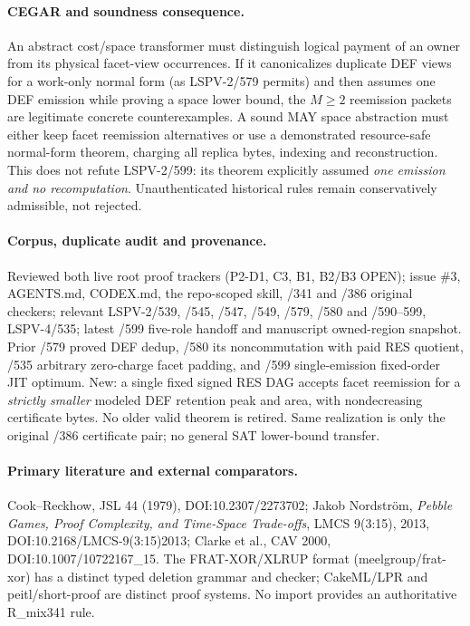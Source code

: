 \documentclass[11pt]{article}
\begin{document}
\paragraph{CEGAR and soundness consequence.}
An abstract cost/space transformer must distinguish logical payment of an owner from its physical facet-view occurrences. If it canonicalizes duplicate DEF views for a work-only normal form (as LSPV-2/579 permits) and then assumes one DEF emission while proving a space lower bound, the $M\ge2$ reemission packets are legitimate concrete counterexamples. A sound MAY space abstraction must either keep facet reemission alternatives or use a demonstrated resource-safe normal-form theorem, charging all replica bytes, indexing and reconstruction. This does not refute LSPV-2/599: its theorem explicitly assumed \emph{one emission and no recomputation}. Unauthenticated historical rules remain conservatively admissible, not rejected.

\paragraph{Corpus, duplicate audit and provenance.}
Reviewed both live root proof trackers (P2-D1, C3, B1, B2/B3 OPEN); issue \#3, AGENTS.md, CODEX.md, the repo-scoped skill, /341 and /386 original checkers; relevant LSPV-2/539, /545, /547, /549, /579, /580 and /590--599, LSPV-4/535; latest /599 five-role handoff and manuscript owned-region snapshot. Prior /579 proved DEF dedup, /580 its noncommutation with paid RES quotient, /535 arbitrary zero-charge facet padding, and /599 single-emission fixed-order JIT optimum. New: a single fixed signed RES DAG accepts facet reemission for a \emph{strictly smaller} modeled DEF retention peak and area, with nondecreasing certificate bytes. No older valid theorem is retired. Same realization is only the original /386 certificate pair; no general SAT lower-bound transfer.

\paragraph{Primary literature and external comparators.}
Cook--Reckhow, JSL 44 (1979), DOI:10.2307/2273702; Jakob Nordstr\"om, \emph{Pebble Games, Proof Complexity, and Time-Space Trade-offs}, LMCS 9(3:15), 2013, DOI:10.2168/LMCS-9(3:15)2013; Clarke et al., CAV 2000, DOI:10.1007/10722167\_15. The FRAT-XOR/XLRUP format (meelgroup/frat-xor) has a distinct typed deletion grammar and checker; CakeML/LPR and peitl/short-proof are distinct proof systems. No import provides an authoritative R_mix341 rule.
\end{document}
